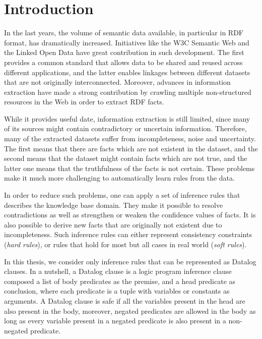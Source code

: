\chapter{Introduction}
\label{ch:intro}

In the last years, the volume of semantic data available, in particular in RDF format, has dramatically
increased. Initiatives like the W3C Semantic Web and the Linked Open Data  have great contribution in such
development. The first provides a common standard that allows data to be shared and reused across different
applications, and the latter enables linkages between different datasets that are not originally interconnected.
Moreover, advances in information extraction have made a strong contribution by crawling multiple non-structured
resources in the Web in order to extract RDF facts.

While it provides useful date, information extraction is still limited, since many of its sources might contain
contradictory or uncertain information. Therefore, many of the extracted datasets suffer from incompleteness, noise and
uncertainty. The first means that there are facts which are not existent in the dataset,  and the second means that
the dataset might contain facts which are not true, and the latter one means that the truthfulness of the facts is not
certain. These problems make it much more challenging to automatically learn rules from the data.


In order to reduce such problems, one can apply a set of inference rules that describes the knowledge base domain.
They make it possible to resolve contradictions as well as strengthen or weaken the confidence values of facts. It is
also possible to derive new facts that are originally not existent due to incompleteness. Such inference rules can
either represent consistency constraints (\emph{hard rules}), or rules that hold for most but all cases in real
world (\emph{soft rules}).

In this thesis, we consider only inference rules that can be represented as Datalog clauses. In a nutshell,
a Datalog clause is a logic program inference clause composed a list of body predicates as the premise, and a
head predicate as conclusion, where each predicate is a tuple with variables or constants as arguments. A Datalog clause
is safe if all the variables present in the head are also present in the body, moreover, negated predicates are allowed
in the body as long as every variable present in a negated predicate is also present in a non-negated predicate.

